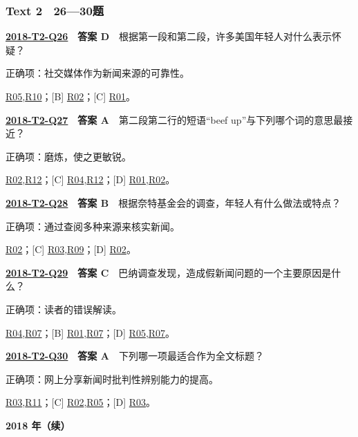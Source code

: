 \documentclass[11pt,a4paper]{article}
\begin{document}
\subsubsection{Text 2　26—30题}
\label{idx-2018-T2-Q26}
\noindent\textbf{\href{https://zj139.github.io/math-notes/english/d29f6738597e5d009a188a76/\#q26}{2018-T2-Q26}　答案 D}　根据第一段和第二段，许多美国年轻人对什么表示怀疑？\par\nopagebreak
\noindent 正确项：社交媒体作为新闻来源的可靠性。\par\nopagebreak
\noindent [A] \hyperref[cat-R05]{R05},\hyperref[cat-R10]{R10}；[B] \hyperref[cat-R02]{R02}；[C] \hyperref[cat-R01]{R01}。
\par\smallskip
{}\label{idx-2018-T2-Q27}
\noindent\textbf{\href{https://zj139.github.io/math-notes/english/d29f6738597e5d009a188a76/\#q27}{2018-T2-Q27}　答案 A}　第二段第二行的短语“beef up”与下列哪个词的意思最接近？\par\nopagebreak
\noindent 正确项：磨炼，使之更敏锐。\par\nopagebreak
\noindent [B] \hyperref[cat-R02]{R02},\hyperref[cat-R12]{R12}；[C] \hyperref[cat-R04]{R04},\hyperref[cat-R12]{R12}；[D] \hyperref[cat-R01]{R01},\hyperref[cat-R02]{R02}。
\par\smallskip
{}\label{idx-2018-T2-Q28}
\noindent\textbf{\href{https://zj139.github.io/math-notes/english/d29f6738597e5d009a188a76/\#q28}{2018-T2-Q28}　答案 B}　根据奈特基金会的调查，年轻人有什么做法或特点？\par\nopagebreak
\noindent 正确项：通过查阅多种来源来核实新闻。\par\nopagebreak
\noindent [A] \hyperref[cat-R02]{R02}；[C] \hyperref[cat-R03]{R03},\hyperref[cat-R09]{R09}；[D] \hyperref[cat-R02]{R02}。
\par\smallskip
{}\label{idx-2018-T2-Q29}
\noindent\textbf{\href{https://zj139.github.io/math-notes/english/d29f6738597e5d009a188a76/\#q29}{2018-T2-Q29}　答案 C}　巴纳调查发现，造成假新闻问题的一个主要原因是什么？\par\nopagebreak
\noindent 正确项：读者的错误解读。\par\nopagebreak
\noindent [A] \hyperref[cat-R04]{R04},\hyperref[cat-R07]{R07}；[B] \hyperref[cat-R01]{R01},\hyperref[cat-R07]{R07}；[D] \hyperref[cat-R05]{R05},\hyperref[cat-R07]{R07}。
\par\smallskip
{}\label{idx-2018-T2-Q30}
\noindent\textbf{\href{https://zj139.github.io/math-notes/english/d29f6738597e5d009a188a76/\#q30}{2018-T2-Q30}　答案 A}　下列哪一项最适合作为全文标题？\par\nopagebreak
\noindent 正确项：网上分享新闻时批判性辨别能力的提高。\par\nopagebreak
\noindent [B] \hyperref[cat-R03]{R03},\hyperref[cat-R11]{R11}；[C] \hyperref[cat-R02]{R02},\hyperref[cat-R05]{R05}；[D] \hyperref[cat-R03]{R03}。
\par\smallskip
\clearpage\noindent\textbf{2018 年（续）}\par
\end{document}
